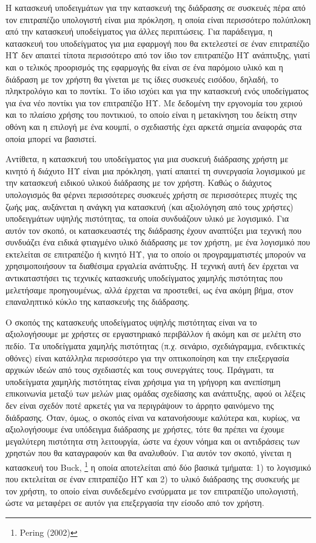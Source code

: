 \documentclass[
]{article}
\begin{document}
Η κατασκευή υποδειγμάτων για την κατασκευή της διάδρασης σε συσκευές
πέρα από τον επιτραπέζιο υπολογιστή είναι μια πρόκληση, η οποία είναι
περισσότερο πολύπλοκη από την κατασκευή υποδείγματος για άλλες
περιπτώσεις. Για παράδειγμα, η κατασκευή του υποδείγματος για μια
εφαρμογή που θα εκτελεστεί σε έναν επιτραπέζιο ΗΥ δεν απαιτεί τίποτα
περισσότερο από τον ίδιο τον επιτραπέζιο ΗΥ ανάπτυξης, γιατί και ο
τελικός προορισμός της εφαρμογής θα είναι σε ένα παρόμοιο υλικό και η
διάδραση με τον χρήστη θα γίνεται με τις ίδιες συσκευές εισόδου, δηλαδή,
το πληκτρολόγιο και το ποντίκι. Το ίδιο ισχύει και για την κατασκευή
ενός υποδείγματος για ένα νέο ποντίκι για τον επιτραπέζιο ΗΥ. Με
δεδομένη την εργονομία του χεριού και το πλαίσιο χρήσης του ποντικιού,
το οποίο είναι η μετακίνηση του δείκτη στην οθόνη και η επιλογή με ένα
κουμπί, ο σχεδιαστής έχει αρκετά σημεία αναφοράς στα οποία μπορεί να
βασιστεί.

Αντίθετα, η κατασκευή του υποδείγματος για μια συσκευή διάδρασης χρήστη
με κινητό ή διάχυτο ΗΥ είναι μια πρόκληση, γιατί απαιτεί τη συνεργασία
λογισμικού με την κατασκευή ειδικού υλικού διάδρασης με τον χρήστη.
Καθώς ο διάχυτος υπολογισμός θα φέρνει περισσότερες συσκευές χρήστη σε
περισσότερες πτυχές της ζωής μας, αυξάνεται η ανάγκη για κατασκευή (και
αξιολόγηση από τους χρήστες) υποδειγμάτων υψηλής πιστότητας, τα οποία
συνδυάζουν υλικό με λογισμικό. Για αυτόν τον σκοπό, οι κατασκευαστές της
διάδρασης έχουν αναπτύξει μια τεχνική που συνδυάζει ένα ειδικά φτιαγμένο
υλικό διάδρασης με τον χρήστη, με ένα λογισμικό που εκτελείται σε
επιτραπέζιο ή κινητό ΗΥ, για το οποίο οι προγραμματιστές μπορούν να
χρησιμοποιήσουν τα διαθέσιμα εργαλεία ανάπτυξης. Η τεχνική αυτή δεν
έρχεται να αντικαταστήσει τις τεχνικές κατασκευής υποδείγματος χαμηλής
πιστότητας που μελετήσαμε προηγουμένως, αλλά έρχεται να προστεθεί, ως
ένα ακόμη βήμα, στον επαναληπτικό κύκλο της κατασκευής της διάδρασης.

Ο σκοπός της κατασκευής υποδείγματος υψηλής πιστότητας είναι να το
αξιολογήσουμε με χρήστες σε εργαστηριακό περιβάλλον ή ακόμη και σε
μελέτη στο πεδίο. Τα υποδείγματα χαμηλής πιστότητας (π.χ. σενάριο,
σχεδιάγραμμα, ενδεικτικές οθόνες) είναι κατάλληλα περισσότερο για την
οπτικοποίηση και την επεξεργασία αρχικών ιδεών από τους σχεδιαστές και
τους συνεργάτες τους. Πράγματι, τα υποδείγματα χαμηλής πιστότητας είναι
χρήσιμα για τη γρήγορη και ανεπίσημη επικοινωνία μεταξύ των μελών μιας
ομάδας σχεδίασης και ανάπτυξης, αφού οι λέξεις δεν είναι σχεδόν ποτέ
αρκετές για να περιγράψουν το άρρητο φαινόμενο της διάδρασης. Όταν,
όμως, ο σκοπός είναι να κατανοήσουμε καλύτερα και, κυρίως, να
αξιολογήσουμε ένα υπόδειγμα διάδρασης με χρήστες, τότε θα πρέπει να
έχουμε μεγαλύτερη πιστότητα στη λειτουργία, ώστε να έχουν νόημα και οι
αντιδράσεις των χρηστών που θα καταγραφούν και θα αναλυθούν. Για αυτόν
τον σκοπό, γίνεται η κατασκευή του Buck, \footnote{Pering (2002)} η
οποία αποτελείται από δύο βασικά τμήματα: 1) το λογισμικό που εκτελείται
σε έναν επιτραπέζιο ΗΥ και 2) το υλικό διάδρασης της συσκευής με τον
χρήστη, το οποίο είναι συνδεδεμένο ενσύρματα με τον επιτραπέζιο
υπολογιστή, ώστε να μεταφέρει σε αυτόν για επεξεργασία την είσοδο από
τον χρήστη.
\end{document}
